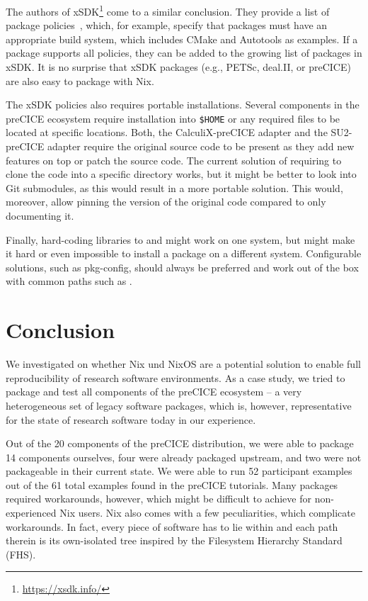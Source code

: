 \documentclass{eceasst}
\begin{document}
The authors of xSDK\footnote{\url{https://xsdk.info/}} come to a similar conclusion.
They provide a list of package policies~\cite{xSDK2023}, which, for example, specify that packages must have an appropriate build system, which includes CMake and Autotools as examples.
If a package supports all policies, they can be added to the growing list of packages in xSDK.
It is no surprise that xSDK packages (e.g., PETSc, deal.II, or preCICE) are also easy to package with Nix.

The xSDK policies also requires portable installations. Several components in the preCICE ecosystem require installation into \texttt{\$HOME} or any required files to be located at specific locations.
Both, the CalculiX-preCICE adapter and the SU2-preCICE adapter require the original source code to be present as they add new features on top or patch the source code.
The current solution of requiring to clone the code into a specific directory works, but it might be better to look into Git submodules, as this would result in a more portable solution.
This would, moreover, allow pinning the version of the original code compared to only documenting it.

Finally, hard-coding libraries to  and  might work on one system, but might make it hard or even impossible to install a package on a different system.
Configurable solutions, such as pkg-config, should always be preferred and work out of the box with common paths such as .

\section{Conclusion}
\label{sec:conclusion}

We investigated on whether Nix und NixOS are a potential solution to enable full reproducibility of research software environments. As a case study, we tried to package and test all components of the preCICE ecosystem -- a very heterogeneous set of legacy software packages, which is, however, representative for the state of research software today in our experience.

Out of the 20 components of the preCICE distribution, we were able to package 14 components ourselves, four were already packaged upstream, and two were not packageable in their current state.
We were able to run 52 participant examples out of the 61 total examples found in the preCICE tutorials.
Many packages required workarounds, however, which might be difficult to achieve for non-experienced Nix users.
Nix also comes with a few peculiarities, which complicate workarounds.
In fact, every piece of software has to lie within  and each path therein is its own-isolated tree inspired by the Filesystem Hierarchy Standard (FHS).
\end{document}
